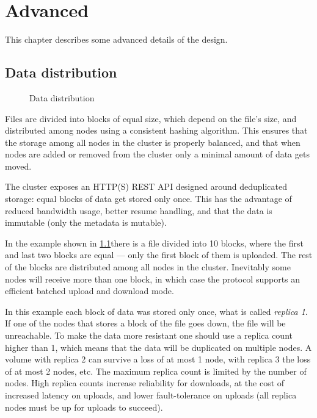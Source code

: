 \chapter{Advanced}
This chapter describes some advanced details of the \SX design.

\section{Data distribution}

\ifpdf
\begin{figure}
	\centering
	
	\caption{Data distribution}
	\label{fig:dist}
\end{figure}
\fi

Files are divided into blocks of equal size, which depend on the file's size,
and distributed among \SX nodes using a consistent hashing algorithm. This
ensures that the storage among all nodes in the cluster is properly balanced,
and that when nodes are added or removed from the cluster only a minimal amount
of data gets moved.

The cluster exposes an HTTP(S) REST API designed around deduplicated storage:
equal blocks of data get stored only once. This has the advantage of reduced
bandwidth usage, better resume handling, and that the data is immutable (only
the metadata is mutable).

In the example shown in \ifpdf{}\else\ref{fig:dist}\fi there is a 
file divided into 10 blocks, where the first and last two blocks are
equal --- only the first block of them is uploaded. The rest of the
blocks are distributed among all nodes in the cluster. Inevitably some
nodes will receive more than one block, in which case the protocol
supports an efficient batched upload and download mode.

In this example each block of data was stored only once, what is called
\emph{replica 1}. If one of the nodes that stores a block of the file goes down,
the file will be unreachable. To make the data more resistant one should
use a replica count higher than 1, which means that the data will be
duplicated on multiple nodes. A volume with replica 2 can survive a loss of
at most 1 node, with replica 3 the loss of at most 2 nodes, etc. The maximum
replica count is limited by the number of nodes. High replica counts increase
reliability for downloads, at the cost of increased latency on uploads, and
lower fault-tolerance on uploads (all replica nodes must be up for uploads to
succeed).

